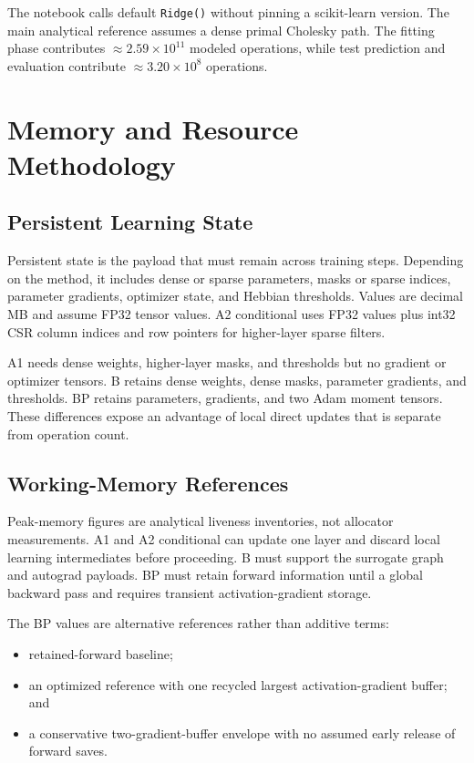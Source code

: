 \documentclass{article}
\begin{document}
    The notebook calls default \texttt{Ridge()} without pinning a scikit-learn version. The main analytical reference assumes a dense primal Cholesky path. The fitting phase contributes $\approx 2.59\times 10^{11}$ modeled operations, while test prediction and evaluation contribute $\approx 3.20\times 10^{8}$ operations.
    
    \section{Memory and Resource Methodology}
    
    \subsection{Persistent Learning State}
    
    Persistent state is the payload that must remain across training steps. Depending on the method, it includes dense or sparse parameters, masks or sparse indices, parameter gradients, optimizer state, and Hebbian thresholds. Values are decimal MB and assume FP32 tensor values. A2 conditional uses FP32 values plus int32 CSR column indices and row pointers for higher-layer sparse filters.
    
    A1 needs dense weights, higher-layer masks, and thresholds but no gradient or optimizer tensors. B retains dense weights, dense masks, parameter gradients, and thresholds. BP retains parameters, gradients, and two Adam moment tensors. These differences expose an advantage of local direct updates that is separate from operation count.
    
    \subsection{Working-Memory References}
    
    Peak-memory figures are analytical liveness inventories, not allocator measurements. A1 and A2 conditional can update one layer and discard local learning intermediates before proceeding. B must support the surrogate graph and autograd payloads. BP must retain forward information until a global backward pass and requires transient activation-gradient storage.
    
    The BP values are alternative references rather than additive terms:
    \begin{itemize}[noitemsep]
    \item retained-forward baseline;
    \item an optimized reference with one recycled largest activation-gradient buffer; and
    \item a conservative two-gradient-buffer envelope with no assumed early release of forward saves.
    \end{itemize}
    
\end{document}
